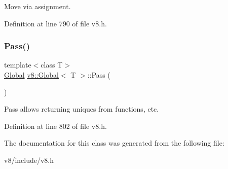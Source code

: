 Move via assignment. 

Definition at line 790 of file v8.\+h.

\mbox{\label{classv8_1_1Global_a914903149cc752468d4a3a11b6089c7e}} 
\subsubsection{\texorpdfstring{Pass()}{Pass()}}
{\footnotesize\ttfamily template$<$class T$>$ \\
\mbox{\hyperlink{classv8_1_1Global}{Global}} \mbox{\hyperlink{classv8_1_1Global}{v8\+::\+Global}}$<$ T $>$\+::Pass (\begin{DoxyParamCaption}{ }\end{DoxyParamCaption})\hspace{0.3cm}{\ttfamily [inline]}}

Pass allows returning uniques from functions, etc. 

Definition at line 802 of file v8.\+h.



The documentation for this class was generated from the following file\+:\begin{DoxyCompactItemize}
\item 
v8/include/v8.\+h\end{DoxyCompactItemize}
